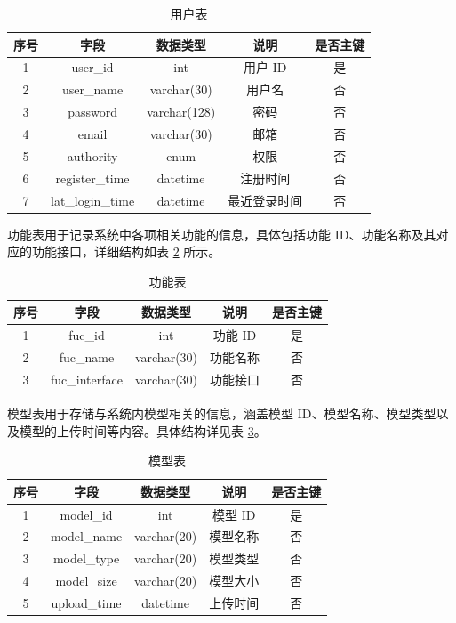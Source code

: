 \begin{table}[htb]
    \centering
    \caption{用户表} \label{tab:user-table}
    \begin{tabular}{ccccc}
        \toprule
        \textbf{序号} & \textbf{字段} & \textbf{数据类型} & \textbf{说明} & \textbf{是否主键} \\
        \midrule
        1 & user\_id & int & 用户 ID & 是 \\
        2 & user\_name & varchar(30) & 用户名 & 否 \\
        3 & password & varchar(128) & 密码 & 否 \\
        4 & email & varchar(30) & 邮箱 & 否 \\
        5 & authority & enum & 权限 & 否 \\
        6 & register\_time & datetime & 注册时间 & 否 \\
        7 & lat\_login\_time & datetime & 最近登录时间 & 否 \\
        \bottomrule
    \end{tabular}
\end{table}

功能表用于记录系统中各项相关功能的信息，具体包括功能 ID、功能名称及其对应的功能接口，详细结构如表 \ref{tab:func-table} 所示。

\begin{table}[htb]
    \centering
    \caption{功能表} \label{tab:func-table}
    \begin{tabular}{ccccc}
        \toprule
        \textbf{序号} & \textbf{字段} & \textbf{数据类型} & \textbf{说明} & \textbf{是否主键} \\
        \midrule
        1 & fuc\_id & int & 功能 ID & 是 \\
        2 & fuc\_name & varchar(30) & 功能名称 & 否 \\
        3 & fuc\_interface & varchar(30) & 功能接口 & 否 \\
        \bottomrule
    \end{tabular}
\end{table}

模型表用于存储与系统内模型相关的信息，涵盖模型 ID、模型名称、模型类型以及模型的上传时间等内容。具体结构详见表 \ref{tab:model-table}。

\begin{table}[htb]
    \centering
    \caption{模型表} \label{tab:model-table}
    \begin{tabular}{ccccc}
        \toprule
        \textbf{序号} & \textbf{字段} & \textbf{数据类型} & \textbf{说明} & \textbf{是否主键} \\
        \midrule
        1 & model\_id & int & 模型 ID & 是 \\
        2 & model\_name & varchar(20) & 模型名称 & 否 \\
        3 & model\_type & varchar(20) & 模型类型 & 否 \\
        4 & model\_size & varchar(20) & 模型大小 & 否 \\
        5 & upload\_time & datetime & 上传时间 & 否 \\
        \bottomrule
    \end{tabular}
\end{table}

